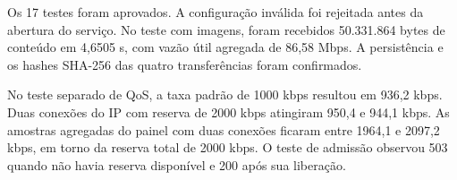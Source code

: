 Os 17 testes foram aprovados. A configuração inválida foi rejeitada antes da abertura do serviço. No teste com imagens, foram recebidos 50.331.864 bytes de conteúdo em 4,6505 s, com vazão útil agregada de 86,58 Mbps. A persistência e os hashes SHA-256 das quatro transferências foram confirmados.

No teste separado de QoS, a taxa padrão de 1000 kbps resultou em 936,2 kbps. Duas conexões do IP com reserva de 2000 kbps atingiram 950,4 e 944,1 kbps. As amostras agregadas do painel com duas conexões ficaram entre 1964,1 e 2097,2 kbps, em torno da reserva total de 2000 kbps. O teste de admissão observou 503 quando não havia reserva disponível e 200 após sua liberação.

